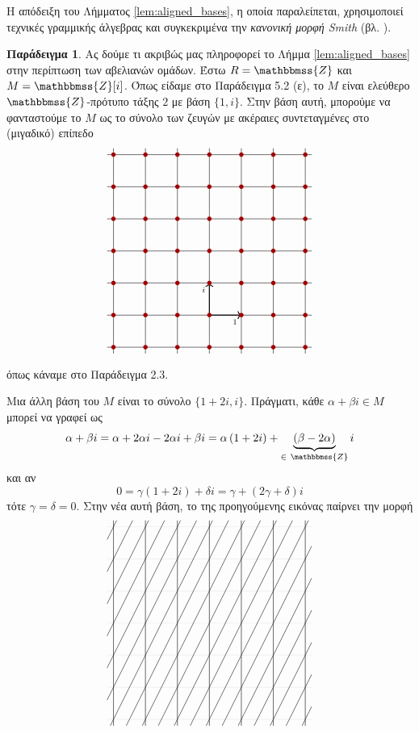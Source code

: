 \documentclass[12pt,a4paper,reqno]{amsart}
\theoremstyle{definition}
\newtheorem{example}[theorem]{Παράδειγμα}
\theoremstyle{remark}
\numberwithin{theorem}{section}
\numberwithin{exercise}{section}
\numberwithin{equation}{section}
\newcommand{\ZZ}{\mathbbmss{Z}}
\begin{document}
Η απόδειξη του Λήμματος \ref{lem:aligned_bases}, η οποία παραλείπεται, χρησιμοποιεί τεχνικές γραμμικής άλγεβρας και συγκεκριμένα την \emph{κανονική μορφή Smith} (βλ. \cite[Κεφάλαιο~4]{EKPA_PID}). 
\begin{example}
    \label{ex:aligned_bases}
    Ας δούμε τι ακριβώς μας πληροφορεί το Λήμμα \ref{lem:aligned_bases} στην περίπτωση των αβελιανών ομάδων. Έστω $R = \ZZ$ και $M = \ZZ[i]$. Όπως είδαμε στο Παράδειγμα 5.2 (ε), το $M$ είναι ελεύθερο $\ZZ$-πρότυπο τάξης $2$ με βάση $\{1, i\}$. Στην βάση αυτή, μπορούμε να φανταστούμε το $M$ ως το σύνολο των ζευγών με ακέραιες συντεταγμένες στο (μιγαδικό) επίπεδο
    \[
    \begin{tikzpicture}[scale=1]
        \draw[step=1cm, thin] (-3.2,-3.2) grid (3.2,3.2);

        \draw[->, thick] (0,-2) -- (0,-1) node[below left] {\scriptsize{$i$}};
        \draw[->, thick] (0,-2) -- (1,-2) node[below left] {\scriptsize{$1$}};

        \foreach \x in {-3,-2,-1,0,1,2,3}
            \foreach \y in {-3,-2,-1,0,1,2,3}
            \fill[darkcandyapplered] (\x,\y) circle (2pt);
    \end{tikzpicture}
    \]
    όπως κάναμε στο Παράδειγμα 2.3. 

    Μια άλλη βάση του $M$ είναι το σύνολο $\{1+2i, i\}$. Πράγματι, κάθε $\alpha + \beta i \in M$ μπορεί να γραφεί ως 
    \[
    \alpha + \beta{i} = \alpha + 2\alpha{i} - 2\alpha{i} + \beta{i} = \alpha\left(
        1 + 2i
    \right) + \underbrace{\left(
        \beta - 2\alpha
    \right)}_{\in \ \ZZ}i
    \]
    και αν 
    \[
    0 = \gamma(1+2i) + \delta{i} = \gamma + (2\gamma+\delta)i
    \]
    τότε $\gamma = \delta = 0$. Στην νέα αυτή βάση, το  της προηγούμενης εικόνας παίρνει την μορφή
    \[
    \begin{tikzpicture}[scale=1]

        \draw[step=1cm, gray!20, thin] (-3.2,-3.2) grid (3.2,3.2);

    \foreach \x in {-3,-2,-1,0,1,2,3}
        \draw[thin] (\x,-3.2) -- (\x,3.2);

    \foreach \x in {-3.1,-2.6,-2.1,-1.6,-1.1,-0.6,-0.1}
        \draw[thin] (\x,-3.2) -- (3.2+\x,3.2);
    \foreach \x in {0.4,0.9,1.4,1.9,2.4,2.9}
        \draw[thin] (\x,-3.2) -- (3.2,3.2-2*\x);
    \foreach \y in {-2.4,-1.4,-.4,.6,1.6,2.6}
        \draw[thin] (-3.2,\y) -- (-1.6-\y/2,3.2);
        


\end{tikzpicture}\]
\end{example}
\end{document}
